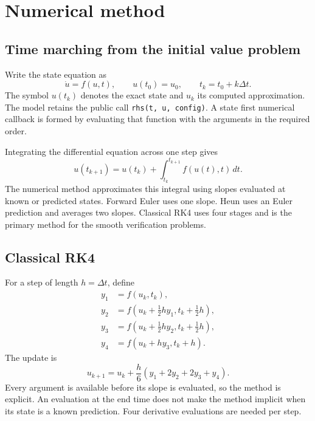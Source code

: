 \section{Numerical method}

\subsection{Time marching from the initial value problem}
Write the state equation as
\[
\dot u=f(u,t),\qquad u(t_0)=u_0,\qquad
t_k=t_0+k\Delta t.
\]
The symbol \(u(t_k)\) denotes the exact state and \(u_k\) its computed approximation. The model retains the public call \texttt{rhs(t, u, config)}. A state first numerical callback is formed by evaluating that function with the arguments in the required order.

Integrating the differential equation across one step gives
\[
u(t_{k+1})=u(t_k)+\int_{t_k}^{t_{k+1}}f(u(t),t)\,dt.
\]
The numerical method approximates this integral using slopes evaluated at known or predicted states. Forward Euler uses one slope. Heun uses an Euler prediction and averages two slopes. Classical RK4 uses four stages and is the primary method for the smooth verification problems.

\subsection{Classical RK4}
For a step of length \(h=\Delta t\), define
\begin{align*}
y_1&=f(u_k,t_k),\\
y_2&=f(u_k+\tfrac12hy_1,t_k+\tfrac12h),\\
y_3&=f(u_k+\tfrac12hy_2,t_k+\tfrac12h),\\
y_4&=f(u_k+hy_3,t_k+h).
\end{align*}
The update is
\[
u_{k+1}=u_k+\frac{h}{6}(y_1+2y_2+2y_3+y_4).
\]
Every argument is available before its slope is evaluated, so the method is explicit. An evaluation at the end time does not make the method implicit when its state is a known prediction. Four derivative evaluations are needed per step.

